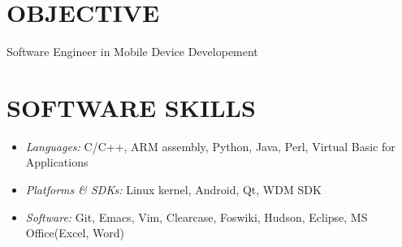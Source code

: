 \documentclass{res}
\begin{document}
\thispagestyle{empty} %

\address{111 South Busey Avenue Apt 5, Urbana, IL 61801\\
  (217)898-3636\\
  pengliu2@illinois.edu}
 
\begin{resume}
\vspace{0.1in}
 
\section{OBJECTIVE}
\vspace{0.1in} 
Software Engineer in Mobile Device Developement
 
\section{SOFTWARE SKILLS} 
\vspace{0.1in}
        \begin{itemize}
                \item {\sl Languages:} C/C++, ARM assembly, Python, Java, Perl, Virtual Basic for Applications
                \item {\sl Platforms \& SDKs:} Linux kernel, Android, Qt, WDM SDK
                \item {\sl Software:} Git, Emacs, Vim, Clearcase, Foswiki, Hudson, Eclipse, MS Office(Excel, Word)
        \end{itemize}


\end{resume}
\end{document}
